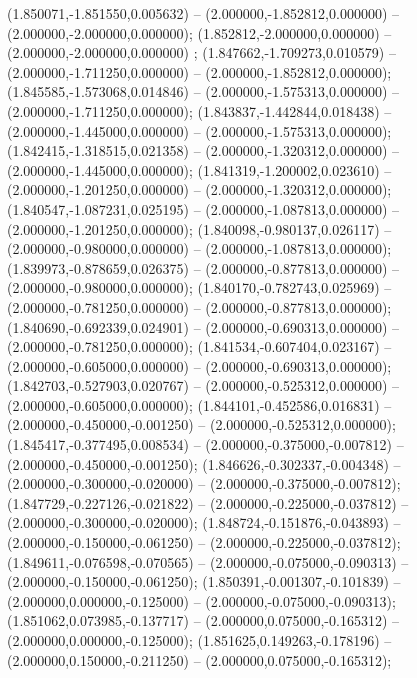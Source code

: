  (1.850071,-1.851550,0.005632) -- (2.000000,-1.852812,0.000000) -- (2.000000,-2.000000,0.000000);
 (1.852812,-2.000000,0.000000) -- (2.000000,-2.000000,0.000000) ;
 (1.847662,-1.709273,0.010579) -- (2.000000,-1.711250,0.000000) -- (2.000000,-1.852812,0.000000);
 (1.845585,-1.573068,0.014846) -- (2.000000,-1.575313,0.000000) -- (2.000000,-1.711250,0.000000);
 (1.843837,-1.442844,0.018438) -- (2.000000,-1.445000,0.000000) -- (2.000000,-1.575313,0.000000);
 (1.842415,-1.318515,0.021358) -- (2.000000,-1.320312,0.000000) -- (2.000000,-1.445000,0.000000);
 (1.841319,-1.200002,0.023610) -- (2.000000,-1.201250,0.000000) -- (2.000000,-1.320312,0.000000);
 (1.840547,-1.087231,0.025195) -- (2.000000,-1.087813,0.000000) -- (2.000000,-1.201250,0.000000);
 (1.840098,-0.980137,0.026117) -- (2.000000,-0.980000,0.000000) -- (2.000000,-1.087813,0.000000);
 (1.839973,-0.878659,0.026375) -- (2.000000,-0.877813,0.000000) -- (2.000000,-0.980000,0.000000);
 (1.840170,-0.782743,0.025969) -- (2.000000,-0.781250,0.000000) -- (2.000000,-0.877813,0.000000);
 (1.840690,-0.692339,0.024901) -- (2.000000,-0.690313,0.000000) -- (2.000000,-0.781250,0.000000);
 (1.841534,-0.607404,0.023167) -- (2.000000,-0.605000,0.000000) -- (2.000000,-0.690313,0.000000);
 (1.842703,-0.527903,0.020767) -- (2.000000,-0.525312,0.000000) -- (2.000000,-0.605000,0.000000);
 (1.844101,-0.452586,0.016831) -- (2.000000,-0.450000,-0.001250) -- (2.000000,-0.525312,0.000000);
 (1.845417,-0.377495,0.008534) -- (2.000000,-0.375000,-0.007812) -- (2.000000,-0.450000,-0.001250);
 (1.846626,-0.302337,-0.004348) -- (2.000000,-0.300000,-0.020000) -- (2.000000,-0.375000,-0.007812);
 (1.847729,-0.227126,-0.021822) -- (2.000000,-0.225000,-0.037812) -- (2.000000,-0.300000,-0.020000);
 (1.848724,-0.151876,-0.043893) -- (2.000000,-0.150000,-0.061250) -- (2.000000,-0.225000,-0.037812);
 (1.849611,-0.076598,-0.070565) -- (2.000000,-0.075000,-0.090313) -- (2.000000,-0.150000,-0.061250);
 (1.850391,-0.001307,-0.101839) -- (2.000000,0.000000,-0.125000) -- (2.000000,-0.075000,-0.090313);
 (1.851062,0.073985,-0.137717) -- (2.000000,0.075000,-0.165312) -- (2.000000,0.000000,-0.125000);
 (1.851625,0.149263,-0.178196) -- (2.000000,0.150000,-0.211250) -- (2.000000,0.075000,-0.165312);
